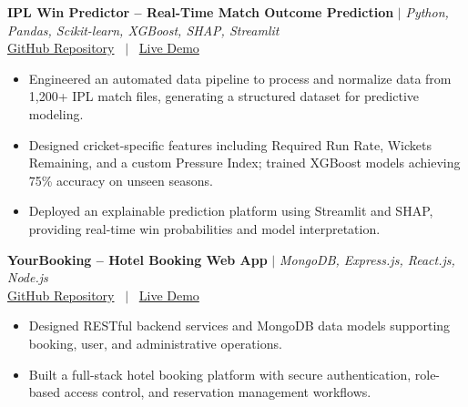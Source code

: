 \documentclass[10pt, a4paper]{article}
\begin{document}
\textbf{IPL Win Predictor -- Real-Time Match Outcome Prediction} $|$ \textit{Python, Pandas, Scikit-learn, XGBoost, SHAP, Streamlit} \\

\small{
\href{https://github.com/PankajKumar-11/IPL-Win-Predictor}{GitHub Repository}
 \ $|$ \ \href{https://demo.example.com}{Live Demo}
} \\

\begin{itemize}

    \item Engineered an automated data pipeline to process and normalize data from 1,200+ IPL match files, generating a structured dataset for predictive modeling.

    \item Designed cricket-specific features including Required Run Rate, Wickets Remaining, and a custom Pressure Index; trained XGBoost models achieving 75\% accuracy on unseen seasons.

    \item Deployed an explainable prediction platform using Streamlit and SHAP, providing real-time win probabilities and model interpretation.

\end{itemize}
\vspace{2pt}

\textbf{YourBooking -- Hotel Booking Web App} $|$ \textit{MongoDB, Express.js, React.js, Node.js} \\

\small{
\href{https://github.com/PankajKumar-11/YourBooking}{GitHub Repository}
 \ $|$ \ \href{https://demo.example.com}{Live Demo}
} \\

\begin{itemize}

    \item Designed RESTful backend services and MongoDB data models supporting booking, user, and administrative operations.

    \item Built a full-stack hotel booking platform with secure authentication, role-based access control, and reservation management workflows.

\end{itemize}
\vspace{2pt}


\end{document}
